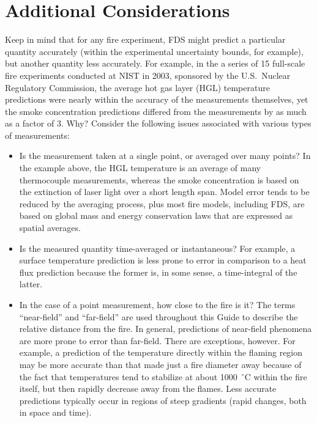 \section{Additional Considerations}


Keep in mind that for any fire experiment, FDS might predict a particular quantity accurately (within the experimental uncertainty bounds, for
example), but another quantity less accurately. For example, in the a series of 15 full-scale fire experiments conducted at NIST in 2003, sponsored
by the U.S.~Nuclear Regulatory Commission, the average hot gas layer (HGL) temperature predictions were nearly within the accuracy of the measurements
themselves, yet the smoke concentration predictions differed from the measurements by as much as a factor of 3. Why? Consider the following issues
associated with various types of measurements:
\begin{itemize}
\item Is the measurement taken at a single point, or averaged over many points? In the example above, the HGL temperature is an average of many
thermocouple measurements, whereas the smoke concentration is based on the extinction of laser light over a short length span. Model error tends to
be reduced by the averaging process, plus most fire models, including FDS, are based on global mass and energy conservation laws that are expressed
as spatial averages.
\item Is the measured quantity time-averaged or instantaneous? For example, a surface temperature prediction is less prone to error in comparison to a
heat flux prediction because the former is, in some sense, a time-integral of the latter.
\item In the case of a point measurement, how close to the fire is it? The terms ``near-field'' and ``far-field'' are used throughout this Guide to describe
the relative distance from the fire. In general, predictions of near-field phenomena are more prone to error than far-field. There are exceptions,
however. For example, a prediction of the temperature directly within the flaming region may be more accurate than that made just a fire diameter
away because of the fact that temperatures tend to stabilize at about 1000~$^\circ$C within the fire itself, but then rapidly decrease away from the
flames. Less accurate predictions typically occur in regions of steep gradients (rapid changes, both in space and time).
\end{itemize}


